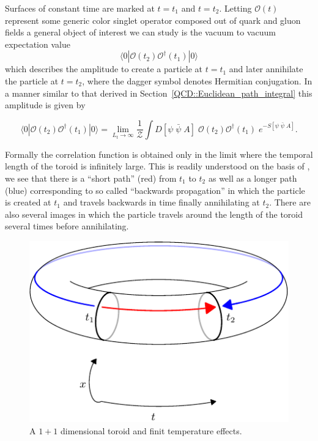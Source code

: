 Surfaces of constant time are marked at $t=t_1$ and $t=t_2$. Letting $\mathcal{O}(t)$ represent some generic color singlet operator composed out of quark and gluon fields a general object of interest we can study is the vacuum to vacuum expectation value 
\begin{equation*}
\langle 0 | \mathcal{O}(t_2) \mathcal{O}^\dagger(t_1) | 0 \rangle 
\end{equation*}
which describes the amplitude to create a particle at $t=t_1$ and later annihilate the particle at $t=t_2$, where the dagger symbol denotes Hermitian conjugation. In a manner similar to that derived in Section~\ref{QCD::Euclidean_path_integral} this amplitude is given by 

\begin{equation*}
\langle 0 | \mathcal{O}(t_2) \mathcal{O}^\dagger(t_1) | 0 \rangle  = \lim_{L_t \to \infty} \frac{1}{\mathcal{Z}} \int D[\psi \; \bar{\psi} \;A] \;  \mathcal{O}(t_2) \mathcal{O}^\dagger(t_1) \; e^{-S[\psi \;\bar{\psi}\;A]}.
\end{equation*} 

Formally the correlation function is obtained only in the limit where the temporal length of the toroid is infinitely large. This is readily understood on the basis of , we see that there is a ``short path'' (red) from $t_1$ to $t_2$ as well as a longer path (blue) corresponding to so called ``backwards propagation'' in which the particle is created at $t_1$ and travels backwards in time finally annihilating at $t_2$. There are also several images in which the particle travels around the length of the toroid several times before annihilating. 

\begin{figure}[htbp]
\centering
\includegraphics[width=0.8\linewidth]{figures/lattice_toroid_finit_T/lattice_toroid_finit_T.pdf}
\caption{ A $1+1$ dimensional toroid and finit temperature effects. \label{fig::QCD_1p1_lattice_finit_T}}
\end{figure}


